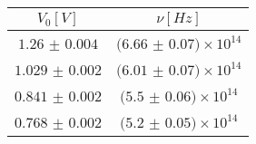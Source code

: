 \begin{tabular}{cc}
\hline
	$V_0[V]$ & $\nu[Hz]$\\ 
\hline
	$1.26$ $\pm$ $0.004$ & $(6.66$ $\pm$ $0.07)\times 10^{14}$ \\
	$1.029$ $\pm$ $0.002$ & $(6.01$ $\pm$ $0.07)\times 10^{14}$ \\
	$0.841$ $\pm$ $0.002$ & $(5.5$ $\pm$ $0.06)\times 10^{14}$ \\
	$0.768$ $\pm$ $0.002$ & $(5.2$ $\pm$ $0.05)\times 10^{14}$ \\
\hline
\end{tabular}
